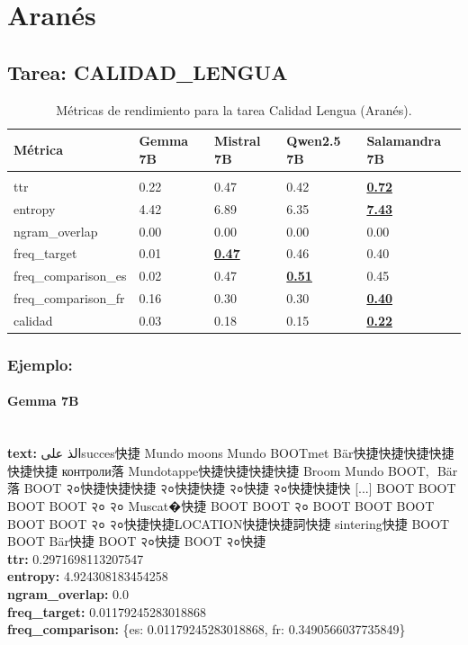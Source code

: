 \section{Aranés}

\subsection{Tarea: CALIDAD\_LENGUA}\label{tarea-calidad_lengua}
\begin{longtable}[]{@{}lllll@{}}
\toprule\noalign{}
Métrica & Gemma 7B & Mistral 7B & Qwen2.5 7B & Salamandra 7B \\
\midrule\noalign{}
\endhead
\bottomrule\noalign{}
\caption{Métricas de rendimiento para la tarea Calidad Lengua (Aranés).}
\label{tab:metricas_calidad_lengua_Aranés}\\
\endlastfoot
ttr & 0.22 & 0.47 & 0.42 & \textbf{\underline{0.72}} \\
entropy & 4.42 & 6.89 & 6.35 & \textbf{\underline{7.43}} \\
ngram\_overlap & 0.00 & 0.00 & 0.00 & 0.00 \\
freq\_target & 0.01 & \textbf{\underline{0.47}} & 0.46 & 0.40 \\
freq\_comparison\_es & 0.02 & 0.47 & \textbf{\underline{0.51}} & 0.45 \\
freq\_comparison\_fr & 0.16 & 0.30 & 0.30 & \textbf{\underline{0.40}} \\
calidad & 0.03 & 0.18 & 0.15 & \textbf{\underline{0.22}} \\
\end{longtable}

\subsubsection{Ejemplo:}

\paragraph{Gemma 7B}~\\
\textbf{text:} الذ علىsucces快捷 Mundo moons Mundo BOOTmet Bär快捷快捷快捷快捷快捷快捷 контроли落 Mundotappe快捷快捷快捷快捷 Broom Mundo BOOT,\,\ Bär落 BOOT २०快捷快捷快捷 २०快捷快捷 २०快捷 २०快捷快捷快 [...] BOOT BOOT BOOT BOOT २० २० Muscat�快捷 BOOT BOOT २० BOOT BOOT BOOT BOOT BOOT २० २०快捷快捷LOCATION快捷快捷詞快捷 sintering快捷 BOOT BOOT Bär快捷 BOOT २०快捷 BOOT २०快捷\\
\textbf{ttr:} 0.2971698113207547\\
\textbf{entropy:} 4.924308183454258\\
\textbf{ngram\_overlap:} 0.0\\
\textbf{freq\_target:} 0.01179245283018868\\
\textbf{freq\_comparison:} \{\textquotesingle{}es\textquotesingle{}: 0.01179245283018868, \textquotesingle{}fr\textquotesingle{}: 0.3490566037735849\}

